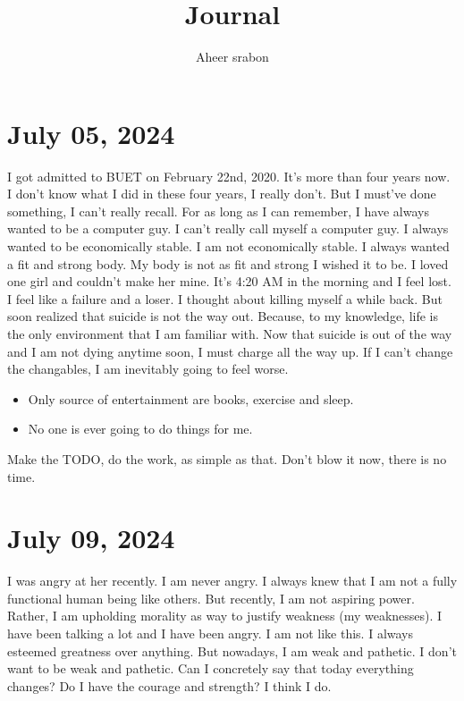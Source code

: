 

\title{Journal}
\author{Aheer srabon}
\date{}


\maketitle

\section{July 05, 2024}
\noindent I got admitted to BUET on February 22nd, 2020. It's more than four years now. I don't know
what I did in these four years, I really don't. But I must've done something, I can't really recall.
For as long as I can remember, I have always wanted to be a computer guy. I can't really call myself
a computer guy. I always wanted to be economically stable. I am not economically stable. I always wanted
a fit and strong body. My body is not as fit and strong I wished it to be. I loved one girl and couldn't
make her mine. It's 4:20 AM in the morning and I feel lost. I feel like a failure and a loser. I thought
about killing myself a while back. But soon realized that suicide is not the way out. Because, to my
knowledge, life is the only environment that I am familiar with. Now that suicide is out of the way
and I am not dying anytime soon, I must charge all the way up. If I can't change the changables, I am
inevitably going to feel worse.

\begin{itemize}
\itemsep0em
	\item Only source of entertainment are books, exercise and sleep.
	\item No one is ever going to do things for me.
\end{itemize}

\noindent Make the TODO, do the work, as simple as that. Don't blow it now, there is no time.

\section{July 09, 2024}
\noindent I was angry at her recently. I am never angry. I always knew that I am not a fully functional
human being like others. But recently, I am not aspiring power. Rather, I am upholding morality as way
to justify weakness (my weaknesses). I have been talking a lot and I have been angry. I am not like this.
I always esteemed greatness over anything. But nowadays, I am weak and pathetic. I don't want to be weak
and pathetic. Can I concretely say that today everything changes? Do I have the courage and strength?
I think I do.

